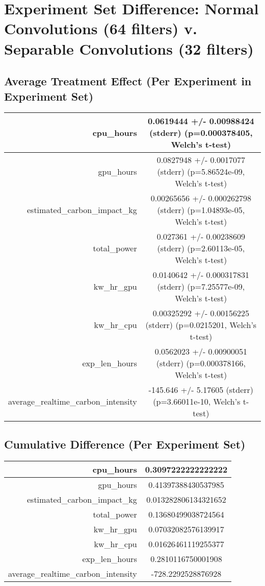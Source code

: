 \documentclass{article}%
\begin{document}
%
\normalsize%
\section{Experiment Set Difference: Normal Convolutions (64 filters) v. Separable Convolutions (32 filters)}%
\label{sec:Experiment Set Difference Normal Convolutions (64 filters) v. Separable Convolutions (32 filters)}%
\subsection{Average Treatment Effect (Per Experiment in Experiment Set)}%
\label{subsec:Average Treatment Effect (Per Experiment in Experiment Set)}%
\begin{tabular}{|r|c|}%
\hline%
cpu\_hours&0.0619444 +/{-} 0.00988424 (stderr) (p=0.000378405, Welch's t{-}test)\\%
\hline%
gpu\_hours&0.0827948 +/{-} 0.0017077 (stderr) (p=5.86524e{-}09, Welch's t{-}test)\\%
\hline%
estimated\_carbon\_impact\_kg&0.00265656 +/{-} 0.000262798 (stderr) (p=1.04893e{-}05, Welch's t{-}test)\\%
\hline%
total\_power&0.027361 +/{-} 0.00238609 (stderr) (p=2.60113e{-}05, Welch's t{-}test)\\%
\hline%
kw\_hr\_gpu&0.0140642 +/{-} 0.000317831 (stderr) (p=7.25577e{-}09, Welch's t{-}test)\\%
\hline%
kw\_hr\_cpu&0.00325292 +/{-} 0.00156225 (stderr) (p=0.0215201, Welch's t{-}test)\\%
\hline%
exp\_len\_hours&0.0562023 +/{-} 0.00900051 (stderr) (p=0.000378166, Welch's t{-}test)\\%
\hline%
average\_realtime\_carbon\_intensity&{-}145.646 +/{-} 5.17605 (stderr) (p=3.66011e{-}10, Welch's t{-}test)\\%
\hline%
\end{tabular}

%
\subsection{Cumulative Difference (Per Experiment Set)}%
\label{subsec:Cumulative Difference (Per Experiment Set)}%
\begin{tabular}{|r|c|}%
\hline%
cpu\_hours&0.3097222222222222\\%
\hline%
gpu\_hours&0.41397388430537985\\%
\hline%
estimated\_carbon\_impact\_kg&0.013282806134321652\\%
\hline%
total\_power&0.13680499038724564\\%
\hline%
kw\_hr\_gpu&0.07032082576139917\\%
\hline%
kw\_hr\_cpu&0.01626461119255377\\%
\hline%
exp\_len\_hours&0.2810116750001908\\%
\hline%
average\_realtime\_carbon\_intensity&{-}728.2292528876928\\%
\hline%
\end{tabular}

%
\end{document}
